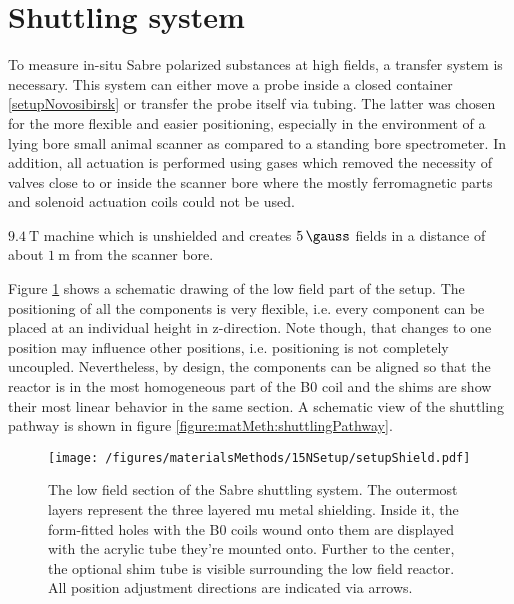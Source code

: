    \section{Shuttling system}\label{sec:shuttlingSystem}
    To measure in-situ Sabre polarized substances at high fields, a transfer system is necessary. This system can either move a probe inside a closed container \ref{setupNovosibirsk} or transfer the probe itself via tubing. The latter was chosen for the more flexible and easier positioning, especially in the environment of a lying bore small animal scanner as compared to a standing bore spectrometer. In addition, all actuation is performed using gases which removed the necessity of valves close to or inside the scanner bore where the mostly ferromagnetic parts and solenoid actuation coils could not be used.

    $\SI{9.4}{\tesla}$ machine which is unshielded and creates $\SI{5}{\gauss}$ fields in a distance of about $\SI{1}{\meter}$ from the scanner bore.

    Figure \ref{figure:materialsMethods:shields15N} shows a schematic drawing of the low field part of the setup. The positioning of all the components is very flexible, i.e. every component can be placed at an individual height in z-direction. Note though, that changes to one position may influence other positions, i.e. positioning is not completely uncoupled. Nevertheless, by design, the components can be aligned so that the reactor is in the most homogeneous part of the B0 coil and the shims are show their most linear behavior in the same section. A schematic view of the shuttling pathway is shown in figure \ref{figure:matMeth:shuttlingPathway}.
        \begin{figure}
            \texttt{[image: /figures/materialsMethods/15NSetup/setupShield.pdf]}
            \caption[Shuttling system shields]{The low field section of the Sabre shuttling system. The outermost layers represent the three layered mu metal shielding. Inside it, the form-fitted holes with the B0 coils wound onto them are displayed with the acrylic tube they're mounted onto. Further to the center, the optional shim tube is visible surrounding the low field reactor. All position adjustment directions are indicated via arrows.}
            \label{figure:materialsMethods:shields15N}
        \end{figure}
